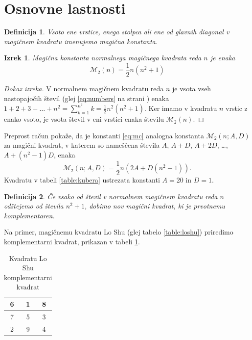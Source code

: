 \documentclass[a4paper,12pt]{article}
\newcommand{\m}{\mathcal{M}_2}
\newcommand{\pojem}[1]{\emph{\color{purple}#1}}
\newenvironment{dokaz}{\begin{proof}[Dokaz izreka]}{\end{proof}}
\newenvironment{magic}[3]{\begin{table}[!ht]
   \large
   \centering
   \caption{#1}
   \label{#2}
   \begin{tabular}{|*{#3}{c|}}
      \hline}
{\end{tabular}
\end{table}}
\newtheorem{definicija}{Definicija}
\newtheorem{izrek}{Izrek}
\begin{document}

\section{Osnovne lastnosti}

\begin{definicija}
      Vsoto ene vrstice, enega stolpca ali ene od glavnih diagonal
      v magičnem kvadratu imenujemo \pojem{magična konstanta}.
\end{definicija}

\newpage
\begin{izrek}
	Magična konstanta normalnega magičnega kvadrata reda $n$
   je enaka
   \begin{equation}
      \label{eq:mc}
      \m(n) = \frac{1}{2} n(n^2+1)
   \end{equation}
\end{izrek}

\begin{dokaz}
	
   V normalnem magičnem kvadratu reda $n$ je vsota vseh nastopajočih
   števil (glej \eqref{eq:numbers} na strani \pageref{eq:numbers}) enaka
   $1+2+3+\dots+n^2=\sum_{k=1}^{n^2}k=\frac{1}{2}n^2(n^2+1)$. Ker imamo
   v kvadratu $n$ vrstic z enako vsoto, je vsota števil v eni vrstici
   enaka številu $\m(n)$. %
\end{dokaz}

Preprost račun pokaže, da je konstanti \eqref{eq:mc} analogna konstanta
$\m(n;A,D)$ za magični kvadrat, v katerem so nameščena števila
$A$, $A+D$, $A+2D$, \dots, $A+(n^2-1)D$, enaka %
\[\m(n; A, D) = \frac{1}{2}n\left(2A + D(n^2 - 1)\right).\]
Kvadratu v tabeli \ref{table:kubera} ustrezata konstanti $A=20$ in $D=1$.

\begin{definicija}
      Če vsako od števil v normalnem magičnem kvadratu reda $n$ odštejemo
      od števila $n^2+1$, dobimo nov magični kvadrat, ki je prvotnemu
      \pojem{komplementaren}.
\end{definicija}

Na primer, magičnemu kvadratu Lo Shu (glej tabelo \ref{table:loshu}) priredimo
komplementarni kvadrat, prikazan v tabeli \ref{table:closhu}.
%
\begin{magic}{Kvadratu Lo Shu komplementarni kvadrat}{table:closhu}{3}
	   6 & 1 & 8 \\\hline
   7 & 5 & 3 \\\hline
   2 & 9 & 4 \\\hline
\end{magic}
\end{document}
